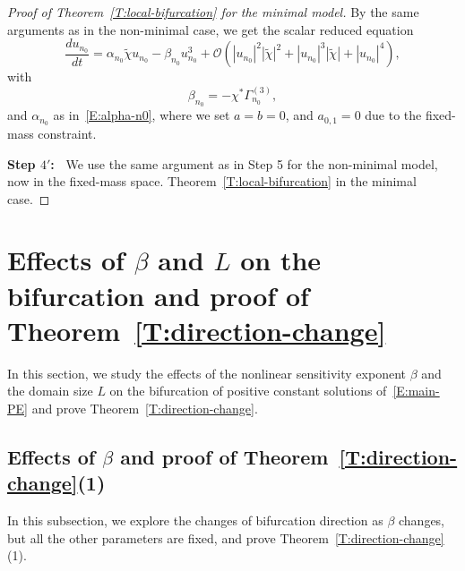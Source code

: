 \documentclass[11pt]{article} %
\theoremstyle{remark}
\theoremstyle{remark}
\numberwithin{equation}{section}
\numberwithin{figure}{section}
\numberwithin{table}{section}
\begin{document}
\begin{proof}[Proof of Theorem~\ref{T:local-bifurcation} for the minimal model]
  By the same arguments as in the non-minimal case, we get the scalar reduced
  equation
  \begin{equation}\label{E:center-ODE-initial-minimal}
    \frac{du_{n_0}}{dt}
    =\alpha_{n_0}\widetilde{\chi} u_{n_0}
    -\beta_{n_0}u_{n_0}^3
    +\mathcal{O}\left(
    |u_{n_0}|^2|\widetilde{\chi}|^2+|u_{n_0}|^3|\widetilde{\chi}|+|u_{n_0}|^4
    \right),
  \end{equation}
  with
  \begin{equation}\label{E:beta-n0-minimal}
    \beta_{n_0}=-\chi^*\Gamma_{n_0}^{(3)},
  \end{equation}
  and $\alpha_{n_0}$ as in~\eqref{E:alpha-n0}, where we set $a = b = 0$, and
  $a_{0,1} = 0$ due to the fixed-mass constraint.

  \smallskip

  \noindent\textbf{Step $4'$:~} We use the same argument as in Step 5 for the
  non-minimal model, now in the fixed-mass space.
  Theorem~\ref{T:local-bifurcation} in the minimal case.
\end{proof}


\section{Effects of $\beta$ and $L$ on the bifurcation and proof of Theorem~\ref{T:direction-change}}
\label{S:direction-change}

In this section, we study the effects of the nonlinear sensitivity exponent
$\beta$ and the domain size $L$ on the bifurcation of positive constant
solutions of~\eqref{E:main-PE} and prove Theorem~\ref{T:direction-change}.

\subsection{Effects of $\beta$  and proof of Theorem~\ref{T:direction-change}(1)}
\label{SS:beta-analysis}

In this subsection, we explore the changes of bifurcation direction as $\beta$
changes, but all the other parameters are fixed, and prove
Theorem~\ref{T:direction-change}(1).
\end{document}
